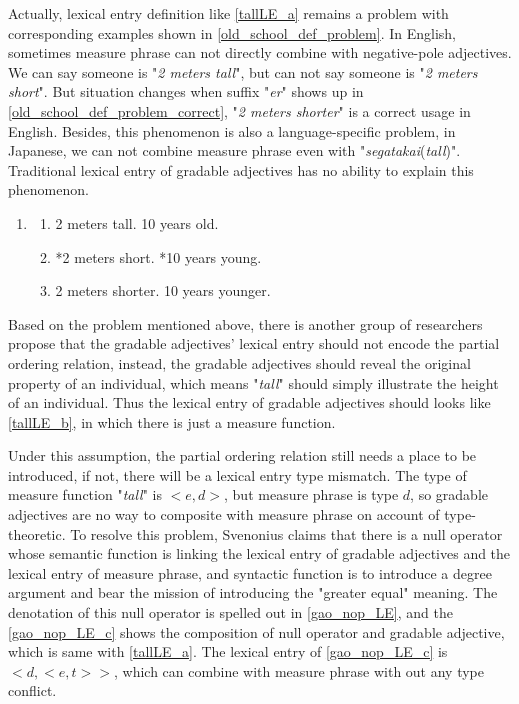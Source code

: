 \documentclass{ctexart}
\let \cite \parencite
\begin{document}
Actually, lexical entry definition like \ref{tallLE_a} remains a problem with corresponding examples shown in \ref{old_school_def_problem}. In English, sometimes measure phrase can not directly combine with negative-pole adjectives. We can say someone is "\textit{2 meters tall}", but can not say someone is "\textit{2 meters short}". But situation changes when suffix "\textit{er}" shows up in \ref{old_school_def_problem_correct}, "\textit{2 meters shorter}" is a correct usage in English. Besides, this phenomenon is also a language-specific problem, in Japanese, we can not combine measure phrase even with "\textit{segatakai}(\textit{tall})". Traditional lexical entry of gradable adjectives has no ability to explain this phenomenon.

\begin{enumerate}[resume]

    \item \label{old_school_def_problem}
    
    \begin{enumerate}[ref=(\arabic{enumi}\alph*)]
        
        \item 2 meters tall. 10 years old.
        \item *2 meters short. *10 years young.
        \item \label{old_school_def_problem_correct} 2 meters shorter. 10 years younger.

    \end{enumerate}

\end{enumerate}

Based on the problem mentioned above, there is another group of researchers propose that the gradable adjectives' lexical entry should not encode the partial ordering relation, instead, the gradable adjectives should reveal the original property of an individual, which means "\textit{tall}" should simply illustrate the height of an individual. Thus the lexical entry of gradable adjectives should looks like \ref{tallLE_b}, in which there is just a measure function. 

Under this assumption, the partial ordering relation still needs a place to be introduced, if not, there will be a lexical entry type mismatch. The type of measure function "\textit{tall}" is $<e,d>$, but measure phrase is type $d$, so gradable adjectives are no way to composite with measure phrase on account of type-theoretic. To resolve this problem, Svenonius\cite{svenonius2006} claims that there is a null operator whose semantic function is linking the lexical entry of gradable adjectives and the lexical entry of measure phrase, and syntactic function is to introduce a degree argument and bear the mission of introducing the "greater equal" meaning. The denotation of this null operator is spelled out in \ref{gao_nop_LE}, and the \ref{gao_nop_LE_c} shows the composition of null operator and gradable adjective, which is same with \ref{tallLE_a}. The lexical entry of \ref{gao_nop_LE_c} is $<d,<e,t>>$, which can combine with measure phrase with out any type conflict.
\end{document}
